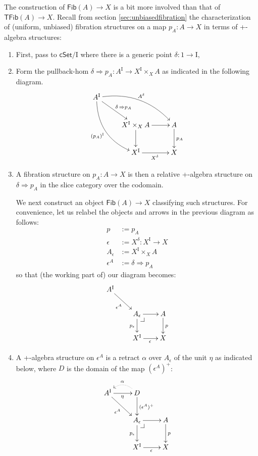 \documentclass[12pt]{article}
\makeatletter
\newcommand{\cSet}{\ensuremath{\mathsf{cSet}}}
\newcommand{\pbcorner}[1][dr]{\save*!/#1-1.2pc/#1:(-1,1)@^{|-}\restore}
\newcommand{\ra}{\ensuremath{\rightarrow}}
\newcommand{\I}{\ensuremath{\mathrm{I}}}
\newcommand{\Fib}{\ensuremath{\mathsf{Fib}}}
\newcommand{\TFib}{\ensuremath{\mathsf{TFib}}}
\theoremstyle{remark}
\theoremstyle{definition}
\makeatother
\begin{document}
The construction of $\Fib(A)\ra X$ is a bit more involved than that of $\TFib(A)\ra X$.  Recall from section \ref{sec:unbiasedfibration} the characterization of (uniform, unbiased) fibration structures on a map $p_A : A\ra X$ in terms of +-algebra structures:  
\begin{enumerate}
\item First, pass to $\cSet/\I$ where there is a generic point $\delta : 1 \ra \I$,

\item Form the pullback-hom $\delta\Rightarrow p_A : A^\I \ra X^\I \times_X A$ as indicated in the following diagram.
\begin{equation}\label{diagram:fibU1}
\xymatrix{
A^\I \ar@/_4ex/ [rdd]_{(p_A)^\I} \ar[rd]^{\delta\, \Rightarrow p_A} \ar@/^4ex/ [rrd]^{A^\delta} && \\
& X^\I \times_{X} A \ar[d] \ar[r] & A \ar[d]^{p_A} \\
& X^\I \ar[r]_{X^\delta} &  X 
}
\end{equation}

\item A fibration structure on $p_A : A\ra X$ is then a relative +-algebra structure on $\delta\Rightarrow p_A$ in the slice category over the codomain. 

We next construct an object $\Fib(A)\ra X$ classifying such structures.
For convenience, let us relabel the objects and arrows in the previous diagram as follows:
\begin{align*}
p &:= p_A\\
\epsilon &:= X^\delta : X^\I \ra X \\
A_\epsilon &:= X^\I \times_X A\\
\epsilon^A &:= \delta\Rightarrow p_A
\end{align*}
so that (the working part of) our diagram becomes:
\begin{equation}\label{diagram:fibU2}
\xymatrix@=2em{
A^\I \ar[rd]_{\epsilon^A} && \\
& A_\epsilon\ar[d]_{p_\epsilon} \ar[r] \pbcorner & A \ar[d]^{p} \\
& X^\I \ar[r]_{\epsilon} &  X 
}
\end{equation}

\item A +-algebra structure on $\epsilon^A$ is a retract $\alpha$ over $A_\epsilon$ of the unit $\eta$ as indicated below, where $D$ is the domain of the map $(\epsilon^A)^+$:
\begin{equation}\label{diagram:fibU3}
\xymatrix{
A^\I \ar[rd]_{\epsilon^A} \ar[r]_\eta & \ar@{.>}@/_1pc/[l]_\alpha D \ar[d]^{(\epsilon^A)^+} & \\
& A_\epsilon\ar[d]_{p_\epsilon} \ar[r] \pbcorner & A \ar[d]^{p} \\
& X^\I \ar[r]_{\epsilon} &  X 
}
\end{equation}


\end{enumerate}
\end{document}

